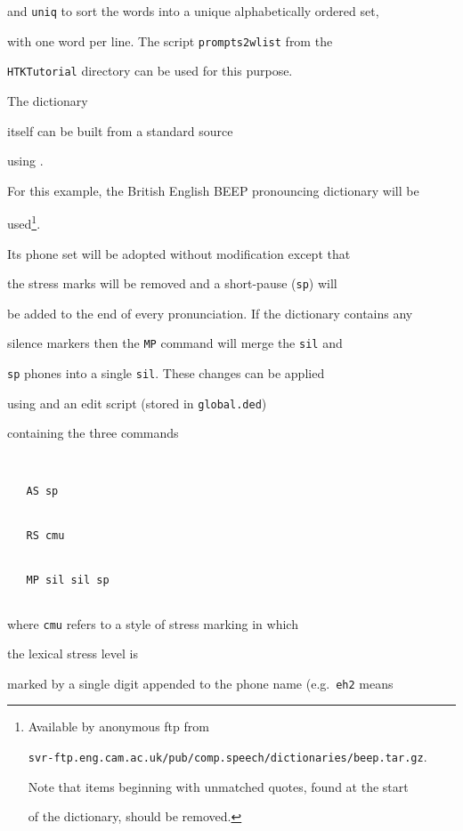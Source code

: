 and \texttt{uniq} to sort the words into a unique alphabetically ordered set,


with one word per line.  The script \texttt{prompts2wlist} from the


\texttt{HTKTutorial} directory can be used for this purpose.





The dictionary  


itself can be built from a standard source 


using .


For this example, the British English BEEP pronouncing dictionary will be


used\footnote{Available by anonymous ftp from 


\texttt{svr-ftp.eng.cam.ac.uk/pub/comp.speech/dictionaries/beep.tar.gz}.


Note that items beginning with unmatched quotes, found at the start


of the dictionary, should be removed.}.  


Its phone set will be adopted without modification except that 


the stress marks will be removed and a short-pause (\texttt{sp}) will


be added to the end of every pronunciation. If the dictionary contains any


silence markers then the \texttt{MP} command will merge the \texttt{sil} and 


\texttt{sp} phones into a single \texttt{sil}. These changes can be applied 


using  and an edit script (stored in \texttt{global.ded})


containing the three commands


\begin{verbatim}


   AS sp


   RS cmu


   MP sil sil sp


\end{verbatim}


where \texttt{cmu} refers to a style of stress marking in which 


the lexical stress level is


marked by a single digit appended to the phone name (e.g.\ \texttt{eh2} means


